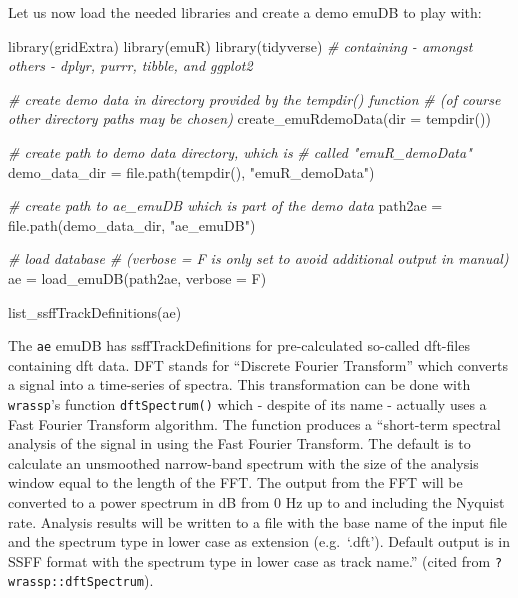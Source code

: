 \documentclass[
]{book}
\newenvironment{Shaded}{\begin{snugshade}}{\end{snugshade}}
\newcommand{\AttributeTok}[1]{\textcolor[rgb]{0.77,0.63,0.00}{#1}}
\newcommand{\CommentTok}[1]{\textcolor[rgb]{0.56,0.35,0.01}{\textit{#1}}}
\newcommand{\FunctionTok}[1]{\textcolor[rgb]{0.00,0.00,0.00}{#1}}
\newcommand{\NormalTok}[1]{#1}
\newcommand{\OtherTok}[1]{\textcolor[rgb]{0.56,0.35,0.01}{#1}}
\newcommand{\StringTok}[1]{\textcolor[rgb]{0.31,0.60,0.02}{#1}}
\begin{document}
Let us now load the needed libraries and create a demo emuDB to play with:

\begin{Shaded}
\begin{Highlighting}[]
\FunctionTok{library}\NormalTok{(gridExtra)}
\FunctionTok{library}\NormalTok{(emuR)}
\FunctionTok{library}\NormalTok{(tidyverse) }\CommentTok{\# containing {-} amongst others {-} dplyr, purrr, tibble, and ggplot2}

\CommentTok{\# create demo data in directory provided by the tempdir() function}
\CommentTok{\# (of course other directory paths may be chosen)}
\FunctionTok{create\_emuRdemoData}\NormalTok{(}\AttributeTok{dir =} \FunctionTok{tempdir}\NormalTok{())}

\CommentTok{\# create path to demo data directory, which is}
\CommentTok{\# called "emuR\_demoData"}
\NormalTok{demo\_data\_dir }\OtherTok{=} \FunctionTok{file.path}\NormalTok{(}\FunctionTok{tempdir}\NormalTok{(), }\StringTok{"emuR\_demoData"}\NormalTok{)}

\CommentTok{\# create path to ae\_emuDB which is part of the demo data}
\NormalTok{path2ae }\OtherTok{=} \FunctionTok{file.path}\NormalTok{(demo\_data\_dir, }\StringTok{"ae\_emuDB"}\NormalTok{)}

\CommentTok{\# load database}
\CommentTok{\# (verbose = F is only set to avoid additional output in manual)}
\NormalTok{ae }\OtherTok{=} \FunctionTok{load\_emuDB}\NormalTok{(path2ae, }\AttributeTok{verbose =}\NormalTok{ F)}

\FunctionTok{list\_ssffTrackDefinitions}\NormalTok{(ae)}
\end{Highlighting}
\end{Shaded}

The \texttt{ae} emuDB has ssffTrackDefinitions for pre-calculated so-called dft-files containing dft data. DFT stands for ``Discrete Fourier Transform'' which converts a signal into a time-series of spectra. This transformation can be done with \texttt{wrassp}'s function \texttt{dftSpectrum()} which - despite of its name - actually uses a Fast Fourier Transform algorithm. The function produces a ``short-term spectral analysis of the signal in using the Fast Fourier Transform. The default is to calculate an unsmoothed narrow-band spectrum with the size of the analysis window equal to the length of the FFT. The output from the FFT will be converted to a power spectrum in dB from 0 Hz up to and including the Nyquist rate. Analysis results will be written to a file with the base name of the input file and the spectrum type in lower case as extension (e.g.~`.dft'). Default output is in SSFF format with the spectrum type in lower case as track name.'' (cited from \texttt{?wrassp::dftSpectrum}).
\end{document}

